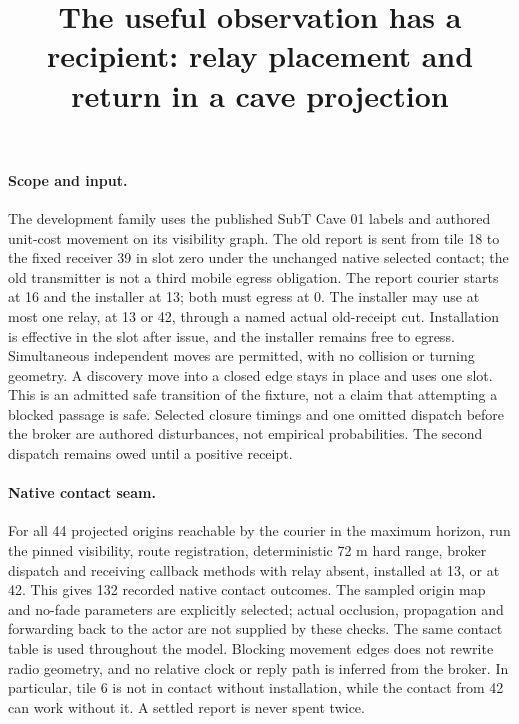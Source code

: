 \documentclass{article}
\begin{document}
\title{The useful observation has a recipient: relay placement and return in a cave projection}
\maketitle

\paragraph{Scope and input.}
The development family uses the published SubT Cave 01 labels
and authored unit-cost movement on its visibility graph.
The old report is sent from tile 18 to the fixed receiver 39
in slot zero under the unchanged native selected contact;
the old transmitter is not a third mobile egress obligation.
The report courier starts at 16 and the installer at 13;
both must egress at 0. The installer may use at most one
relay, at 13 or 42, through a named actual old-receipt cut.
Installation is effective in the slot after issue, and the
installer remains free to egress. Simultaneous independent
moves are permitted, with no collision or turning geometry.
A discovery move into a closed edge stays in place and uses
one slot. This is an admitted safe transition of the fixture,
not a claim that attempting a blocked passage is safe.
Selected closure timings and one omitted dispatch before the
broker are authored disturbances, not empirical probabilities.
The second dispatch remains owed until a positive receipt.

\paragraph{Native contact seam.}
For all 44 projected origins reachable by the courier in the
maximum horizon, run the pinned visibility, route registration,
deterministic 72 m hard range, broker dispatch and receiving
callback methods with relay absent, installed at 13, or at 42.
This gives 132 recorded native contact outcomes. The sampled
origin map and no-fade parameters are explicitly selected; actual
occlusion, propagation and forwarding back to the actor are
not supplied by these checks. The same contact table is used
throughout the model. Blocking movement edges does not rewrite
radio geometry, and no relative clock or reply path is inferred
from the broker. In particular, tile 6 is not in contact without
installation, while the contact from 42 can work without it.
A settled report is never spent twice.
\end{document}
